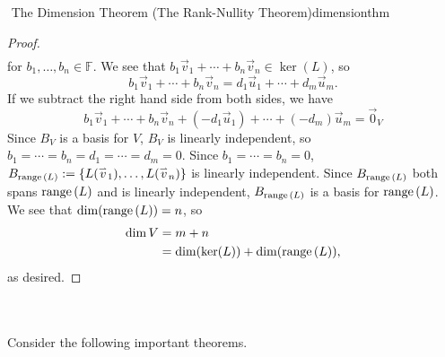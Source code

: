 \begin{theorem}{\Stop\,\,The Dimension Theorem (The Rank-Nullity Theorem)}{dimensionthm}
\begin{proof}
\begin{align*}
                \end{align*}
                for \(b_1,\ldots,b_n\in\mathbb{F}\). We see that \(b_1\vec{v}_1+\cdots+b_n\vec{v}_n\in\ker(L)\), so
                \begin{equation*}
                    b_1\vec{v}_1+\cdots+b_n\vec{v}_n=d_1\vec{u}_1+\cdots+d_m\vec{u}_m.
                \end{equation*}
                If we subtract the right hand side from both sides, we have
                \begin{equation*}
                    b_1\vec{v}_1+\cdots+b_n\vec{v}_n+(-d_1\vec{u}_1)+\cdots+(-d_m)\vec{u}_m=\vec{0}_V
                \end{equation*}
                Since \(B_V\) is a basis for \(V\), \(B_V\) is linearly independent, so \(b_1=\cdots=b_n=d_1=\cdots=d_m=0\). Since \(b_1=\cdots=b_n=0\), \(B_{\text{range\,}(L)}:=\{L(\overset{_{\rightharpoonup}}{v}_1),\ldots,L(\overset{_{\rightharpoonup}}{v}_n)\}\) is linearly independent. Since \(B_{\text{range\,}(L)}\) both spans \(\text{range\,}(L)\) and is linearly independent, \(B_{\text{range\,}(L)}\) is a basis for \(\text{range\,}(L)\). We see that \(\dim(\text{range\,}(L))=n\), so
                \begin{align*}
                    \dim V&=m+n \\
                    &=\dim(\ker(L))+\dim(\text{range\,}(L)),
                \end{align*}
                as desired.

            \end{proof}

        \end{theorem}
        \vphantom
        \\
        \\
        Consider the following important theorems.
